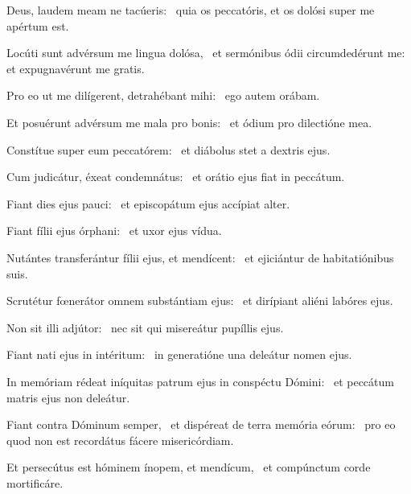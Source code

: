 \item Deus, laudem meam ne tacúeris:~\psstar{} quia os peccatóris, et os dolósi super me apértum est.

\item Locúti sunt advérsum me lingua dolósa,~\pscross{} et sermónibus ódii circumdedérunt me:~\psstar{} et expugnavérunt me gratis.

\item Pro eo ut me dilígerent, detrahébant mihi:~\psstar{} ego autem orábam.

\item Et posuérunt advérsum me mala pro bonis:~\psstar{} et ódium pro dilectióne mea.

\item Constítue super eum peccatórem:~\psstar{} et diábolus stet a dextris ejus.

\item Cum judicátur, éxeat condemnátus:~\psstar{} et orátio ejus fiat in peccátum.

\item Fiant dies ejus pauci:~\psstar{} et episcopátum ejus accípiat alter.

\item Fiant fílii ejus órphani:~\psstar{} et uxor ejus vídua.

\item Nutántes transferántur fílii ejus, et mendícent:~\psstar{} et ejiciántur de habitatiónibus suis.

\item Scrutétur fœnerátor omnem substántiam ejus:~\psstar{} et dirípiant aliéni labóres ejus.

\item Non sit illi adjútor:~\psstar{} nec sit qui misereátur pupíllis ejus.

\item Fiant nati ejus in intéritum:~\psstar{} in generatióne una deleátur nomen ejus.

\item In memóriam rédeat iníquitas patrum ejus in conspéctu Dómini:~\psstar{} et peccátum matris ejus non deleátur.

\item Fiant contra Dóminum semper,~\pscross{} et dispéreat de terra memória eórum:~\psstar{} pro eo quod non est recordátus fácere misericórdiam.

\item Et persecútus est hóminem ínopem, et mendícum,~\psstar{} et compúnctum corde mortificáre.

